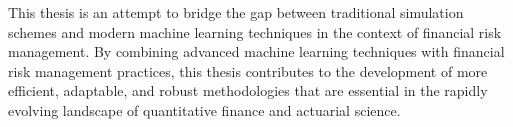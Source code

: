 This thesis is an attempt to bridge the gap between traditional simulation schemes and modern machine learning techniques in the context of financial risk management.
By combining advanced machine learning techniques with financial risk management practices, this thesis contributes to the development of more efficient, adaptable, and robust methodologies that are essential in the rapidly evolving landscape of quantitative finance and actuarial science.